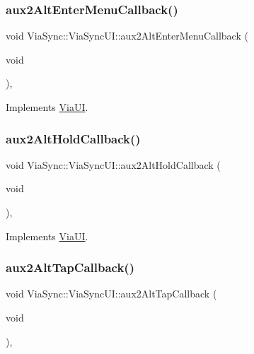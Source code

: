 \subsubsection{\texorpdfstring{aux2\+Alt\+Enter\+Menu\+Callback()}{aux2AltEnterMenuCallback()}}
{\footnotesize\ttfamily void Via\+Sync\+::\+Via\+Sync\+U\+I\+::aux2\+Alt\+Enter\+Menu\+Callback (\begin{DoxyParamCaption}\item[{void}]{ }\end{DoxyParamCaption})\hspace{0.3cm}{\ttfamily [override]}, {\ttfamily [virtual]}}



Implements \mbox{\hyperlink{class_via_u_i_a08a746b666d37ac6bc293303187fd6be}{Via\+UI}}.

\mbox{\label{class_via_sync_1_1_via_sync_u_i_af6b69d61a650e68e37286490191634ed}} 
\subsubsection{\texorpdfstring{aux2\+Alt\+Hold\+Callback()}{aux2AltHoldCallback()}}
{\footnotesize\ttfamily void Via\+Sync\+::\+Via\+Sync\+U\+I\+::aux2\+Alt\+Hold\+Callback (\begin{DoxyParamCaption}\item[{void}]{ }\end{DoxyParamCaption})\hspace{0.3cm}{\ttfamily [override]}, {\ttfamily [virtual]}}



Implements \mbox{\hyperlink{class_via_u_i_ab93989ef608d1b63b854b54278006f49}{Via\+UI}}.

\mbox{\label{class_via_sync_1_1_via_sync_u_i_ad837068e55fb66fe3fe2aa15ff90ec21}} 
\subsubsection{\texorpdfstring{aux2\+Alt\+Tap\+Callback()}{aux2AltTapCallback()}}
{\footnotesize\ttfamily void Via\+Sync\+::\+Via\+Sync\+U\+I\+::aux2\+Alt\+Tap\+Callback (\begin{DoxyParamCaption}\item[{void}]{ }\end{DoxyParamCaption})\hspace{0.3cm}{\ttfamily [override]}, {\ttfamily [virtual]}}



